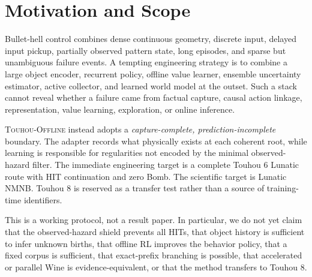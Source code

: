 \documentclass[11pt]{article}
\newcommand{\system}{\textsc{Touhou-Offline}}
\begin{document}
\begin{abstract}
exploratory-action, pre-first-HIT, and raw-boundedness gates.  It is rejected.
A bounded current-root primitive-set model then improved ranking and aggregate
action ablation, but not object-set Brier; exploratory and pre-first-HIT action
deltas reversed, while direct sigmoid Brier saturated 65.05\% of rows and
underpredicted event rate.  It too is rejected.  Changing only its training
loss to BCE-with-logits improved Brier and reduced saturated missed positives
from 89 to one, but still failed the joint gate.  A factual audit then showed
that 99.45\% of h16-positive rows hit only after the current action stopped.
The target is behavior-continuation risk, not supported current-action value;
the next boundary is a safe fixed-short-exposure collection contract, not a
larger learner.  That collection-only test is now preregistered at four policy
roots and has not run.  No hazard scorer or learned policy is selected.
\end{abstract}

\section{Motivation and Scope}

Bullet-hell control combines dense continuous geometry, discrete input,
delayed input pickup, partially observed pattern state, long episodes, and
sparse but unambiguous failure events.  A tempting engineering strategy is to
combine a large object encoder, recurrent policy, offline value learner,
ensemble uncertainty estimator, active collector, and learned world model at
the outset.  Such a stack cannot reveal whether a failure came from factual
capture, causal action linkage, representation, value learning, exploration,
or online inference.

\system{} instead adopts a \emph{capture-complete, prediction-incomplete}
boundary.  The adapter records what physically exists at each coherent root,
while learning is responsible for regularities not encoded by the minimal
observed-hazard filter.  The immediate engineering target is a complete Touhou
6 Lunatic route with HIT continuation and zero Bomb.  The scientific target is
Lunatic NMNB.  Touhou 8 is reserved as a transfer test rather than a source of
training-time identifiers.

This is a working protocol, not a result paper.  In particular, we do not yet
claim that the observed-hazard shield prevents all HITs, that object history is
sufficient to infer unknown births, that offline RL improves the behavior
policy, that a fixed corpus is sufficient, that exact-prefix branching is
possible, that accelerated or parallel Wine is evidence-equivalent, or that
the method transfers to Touhou 8.
\end{document}
